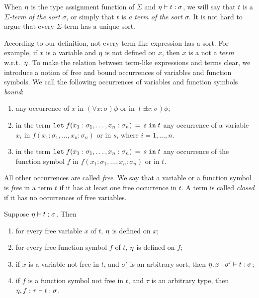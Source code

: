 When $\eta$ is the type assignment function of $\Sigma$ and $\eta \vdash t : \sigma$, we will say that $t$ is a \emph{$\Sigma$-term of the sort $\sigma$}, or simply that $t$ is \emph{a term of the sort $\sigma$}. It is not hard to argue that every $\Sigma$-term has a unique sort.

According to our definition, not every term-like expression has a sort. For example, if $x$ is a variable and $\eta$ is not defined on $x$, then $x$ is a not a $term$ w.r.t.\ $\eta$. To make the relation between term-like expressions and terms clear, we introduce a notion of free and bound occurrences of variables and function symbols. We call the following occurrences of variables and function symbols \emph{bound}:

\begin{enumerate}
\item any occurrence of $x$ in $(\forall x:\sigma) \phi$ or in $(\exists x:\sigma) \phi$;
\item in the term $\mathtt{let}\;{f(x_1:\sigma_1, \ldots, x_n:\sigma_n)}\,=\,{s}\;\allowbreak\mathtt{in}\;{t}$ any occurrence of a variable $x_i$ in $f(x_1:\sigma_1, \ldots, x_n:\sigma_n)$ or in $s$, where $i = 1,\ldots, n$.
\item in the term $\mathtt{let}\;{f(x_1:\sigma_1, \ldots, x_n:\sigma_n)}\,=\,{s}\;\allowbreak\mathtt{in}\;{t}$ any occurrence of the function symbol $f$ in $f(x_1:\sigma_1, \ldots, x_n:\sigma_n)$ or in $t$.
\end{enumerate}
All other occurrences are called \emph{free}. We say that a variable or a function symbol is \emph{free} in a term $t$ if it has at least one free occurrence in $t$. A term is called \emph{closed} if it has no occurrences of free variables.

\begin{theorem}\rm
  Suppose $\eta \vdash t : \sigma$. Then
  \begin{enumerate}
    \item for every free variable $x$ of $t$, $\eta$ is defined on $x$;
    \item for every free function symbol $f$ of $t$, $\eta$ is defined on $f$;
    \item if $x$ is a variable not free in $t$, and $\sigma'$ is an arbitrary sort, then
      $\eta, x : \sigma' \vdash t : \sigma$;
    \item if $f$ is a function symbol not free in $t$, and $\tau$ is an arbitrary type, then $\eta, f : \tau \vdash t : \sigma$. \QED
  \end{enumerate}
\end{theorem}


